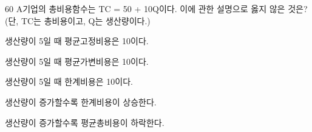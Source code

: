 \begin{question}{60}
A기업의 총비용함수는 TC = 50 + 10Q이다. 이에 관한 설명으로 옳지 않은 것은? (단, TC는 총비용이고, Q는 생산량이다.)
\begin{choices}
  \item 생산량이 5일 때 평균고정비용은 10이다.
  \item 생산량이 5일 때 평균가변비용은 10이다.
  \item 생산량이 5일 때 한계비용은 10이다.
  \item 생산량이 증가할수록 한계비용이 상승한다.
  \item 생산량이 증가할수록 평균총비용이 하락한다.
\end{choices}
\end{question}
